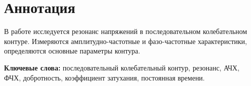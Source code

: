\section*{Аннотация}

В работе исследуется резонанс напряжений в последовательном колебательном контуре. Измеряются амплитудно-частотные и фазо-частотные характеристики, определяются основные параметры контура.

\textbf{Ключевые слова:} последовательный колебательный контур, резонанс, АЧХ, ФЧХ, добротность, коэффициент затухания, постоянная времени.